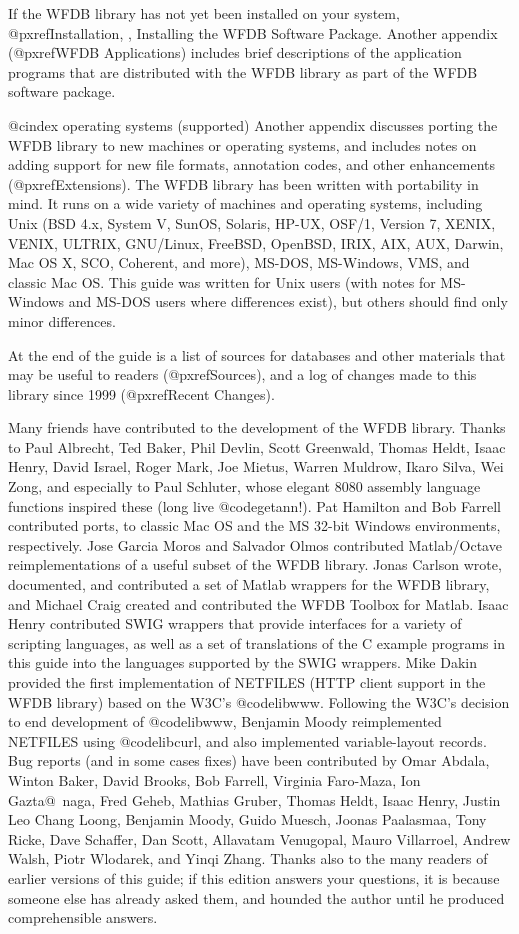 If the WFDB library has not yet been installed on your system,
@pxref{Installation, , Installing the WFDB Software Package}.
Another appendix (@pxref{WFDB Applications}) includes brief
descriptions of the application programs that are distributed with the
WFDB library as part of the WFDB software package.

@cindex operating systems (supported)
Another appendix discusses porting the WFDB library to new machines or
operating systems, and includes notes on adding support for new file
formats, annotation codes, and other enhancements (@pxref{Extensions}).
The WFDB library has been written with portability in mind.  It runs on
a wide variety of machines and operating systems, including Unix (BSD
4.x, System V, SunOS, Solaris, HP-UX, OSF/1, Version 7, XENIX, VENIX,
ULTRIX, GNU/Linux, FreeBSD, OpenBSD, IRIX, AIX, AUX, Darwin, Mac OS X, SCO,
Coherent, and more), MS-DOS, MS-Windows, VMS, and classic Mac OS.
This guide was written for Unix users (with notes for MS-Windows and
MS-DOS users where differences exist), but others should find only minor
differences.

At the end of the guide is a list of sources for databases and other
materials that may be useful to readers (@pxref{Sources}), and a log
of changes made to this library since 1999 (@pxref{Recent Changes}).

Many friends have contributed to the development of the WFDB library.  Thanks
to Paul Albrecht, Ted Baker, Phil Devlin, Scott Greenwald, Thomas Heldt, Isaac
Henry, David Israel, Roger Mark, Joe Mietus, Warren Muldrow, Ikaro Silva, Wei
Zong, and especially to Paul Schluter, whose elegant 8080 assembly language
functions inspired these (long live @code{getann}!).  Pat Hamilton and Bob
Farrell contributed ports, to classic Mac OS and the MS 32-bit Windows
environments, respectively.  Jose Garcia Moros and Salvador Olmos contributed
Matlab/Octave reimplementations of a useful subset of the WFDB library.  Jonas
Carlson wrote, documented, and contributed a set of Matlab wrappers for the
WFDB library, and Michael Craig created and contributed the WFDB Toolbox for
Matlab.  Isaac Henry contributed SWIG wrappers that provide interfaces for a
variety of scripting languages, as well as a set of translations of the C
example programs in this guide into the languages supported by the SWIG
wrappers.  Mike Dakin provided the first implementation of NETFILES (HTTP
client support in the WFDB library) based on the W3C's @code{libwww}.
Following the W3C's decision to end development of @code{libwww}, Benjamin
Moody reimplemented NETFILES using @code{libcurl}, and also implemented
variable-layout records.  Bug reports (and in some cases fixes) have been
contributed by Omar Abdala, Winton Baker, David Brooks, Bob Farrell, Virginia
Faro-Maza, Ion Gazta@~naga, Fred Geheb, Mathias Gruber, Thomas Heldt, Isaac
Henry, Justin Leo Chang Loong, Benjamin Moody, Guido Muesch, Joonas Paalasmaa,
Tony Ricke, Dave Schaffer, Dan Scott, Allavatam Venugopal, Mauro Villarroel,
Andrew Walsh, Piotr Wlodarek, and Yinqi Zhang.  Thanks also to the many readers
of earlier versions of this guide; if this edition answers your questions, it
is because someone else has already asked them, and hounded the author until he
produced comprehensible answers.


